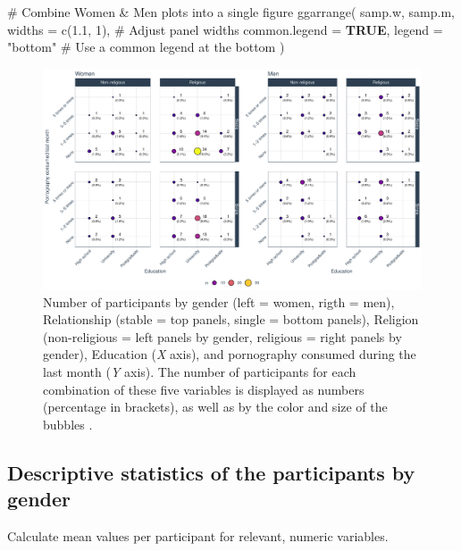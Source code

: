 \documentclass[
  bookmarksnumbered]{article}
\newenvironment{Shaded}{\begin{snugshade}}{\end{snugshade}}
\newcommand{\AttributeTok}[1]{\textcolor[rgb]{0.80,0.80,0.80}{#1}}
\newcommand{\CommentTok}[1]{\textcolor[rgb]{0.50,0.62,0.50}{#1}}
\newcommand{\ConstantTok}[1]{\textcolor[rgb]{0.86,0.64,0.64}{\textbf{#1}}}
\newcommand{\DecValTok}[1]{\textcolor[rgb]{0.86,0.86,0.80}{#1}}
\newcommand{\FloatTok}[1]{\textcolor[rgb]{0.75,0.75,0.82}{#1}}
\newcommand{\FunctionTok}[1]{\textcolor[rgb]{0.94,0.94,0.56}{#1}}
\newcommand{\NormalTok}[1]{\textcolor[rgb]{0.80,0.80,0.80}{#1}}
\newcommand{\StringTok}[1]{\textcolor[rgb]{0.80,0.58,0.58}{#1}}
\begin{document}
\begin{Shaded}
\begin{Highlighting}[]
\CommentTok{\# Combine Women \& Men plots into a single figure}
\FunctionTok{ggarrange}\NormalTok{(}
\NormalTok{  samp.w, samp.m,}
  \AttributeTok{widths =} \FunctionTok{c}\NormalTok{(}\FloatTok{1.1}\NormalTok{, }\DecValTok{1}\NormalTok{), }\CommentTok{\# Adjust panel widths}
  \AttributeTok{common.legend =} \ConstantTok{TRUE}\NormalTok{, }\AttributeTok{legend =} \StringTok{"bottom"} \CommentTok{\# Use a common legend at the bottom}
\NormalTok{)}
\end{Highlighting}
\end{Shaded}

\begin{figure}
\centering
\includegraphics{Sexual_Desire_Arousal_anonymous_files/figure-latex/sample-plot-1.pdf}
\caption{\label{fig:sample-plot}Number of participants by gender (left = women, rigth = men), Relationship (stable = top panels, single = bottom panels), Religion (non-religious = left panels by gender, religious = right panels by gender), Education (\emph{X} axis), and pornography consumed during the last month (\emph{Y} axis). The number of participants for each combination of these five variables is displayed as numbers (percentage in brackets), as well as by the color and size of the bubbles .}
\end{figure}

\subsection{Descriptive statistics of the participants by gender}\label{descriptive-statistics-of-the-participants-by-gender}

Calculate mean values per participant for relevant, numeric variables.
\end{document}
